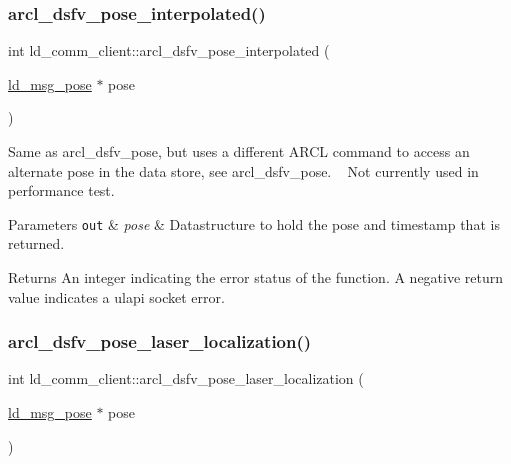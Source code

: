 \subsubsection{\texorpdfstring{arcl\+\_\+dsfv\+\_\+pose\+\_\+interpolated()}{arcl\_dsfv\_pose\_interpolated()}}
{\footnotesize\ttfamily int ld\+\_\+comm\+\_\+client\+::arcl\+\_\+dsfv\+\_\+pose\+\_\+interpolated (\begin{DoxyParamCaption}\item[{\hyperlink{structld__msg__pose}{ld\+\_\+msg\+\_\+pose} $\ast$}]{pose }\end{DoxyParamCaption})}

Same as arcl\+\_\+dsfv\+\_\+pose, but uses a different A\+R\+CL command to access an alternate pose in the data store, see arcl\+\_\+dsfv\+\_\+pose. ~\newline
Not currently used in performance test. 
\begin{DoxyParams}[1]{Parameters}
\mbox{\tt out}  & {\em pose} & Datastructure to hold the pose and timestamp that is returned. \\
\hline
\end{DoxyParams}
\begin{DoxyReturn}{Returns}
An integer indicating the error status of the function. A negative return value indicates a ulapi socket error. 
\end{DoxyReturn}
\mbox{\label{classld__comm__client_ac1520245a4281887fc5442933d519bf9}} 
\subsubsection{\texorpdfstring{arcl\+\_\+dsfv\+\_\+pose\+\_\+laser\+\_\+localization()}{arcl\_dsfv\_pose\_laser\_localization()}}
{\footnotesize\ttfamily int ld\+\_\+comm\+\_\+client\+::arcl\+\_\+dsfv\+\_\+pose\+\_\+laser\+\_\+localization (\begin{DoxyParamCaption}\item[{\hyperlink{structld__msg__pose}{ld\+\_\+msg\+\_\+pose} $\ast$}]{pose }\end{DoxyParamCaption})}

